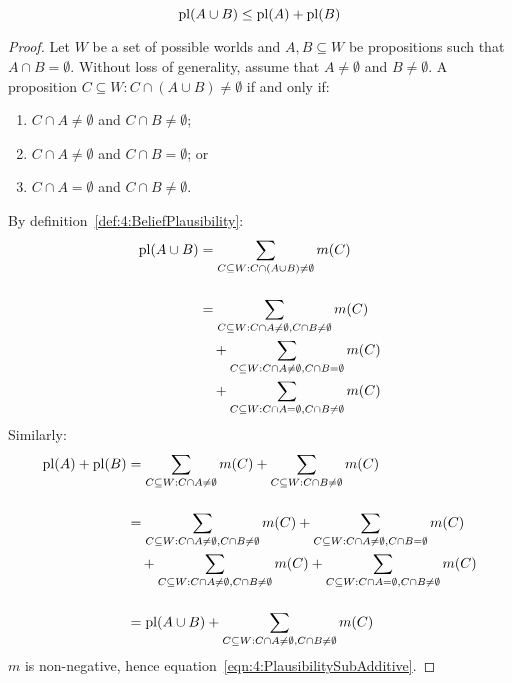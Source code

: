 \begin{thm}
  \begin{equation}
    \label{eqn:4:PlausibilitySubAdditive}
    \operatorname*{pl}(A \cup B) \leq \operatorname*{pl}(A) + \operatorname*{pl}(B)
  \end{equation}

  \begin{proof}
    Let $W$ be a set of possible worlds and $A, B \subseteq W$ be propositions
    such that $A \cap B = \emptyset$.
    Without loss of generality, assume that $A \neq \emptyset$ and
    $B \neq \emptyset$.
    A proposition $C \subseteq W : C \cap (A \cup B) \neq \emptyset$ if and only
    if:
    \begin{enumerate}
      \item $C \cap A \neq \emptyset$ and $C \cap B \neq \emptyset$;
      \item $C \cap A \neq \emptyset$ and $C \cap B = \emptyset$; or
      \item $C \cap A = \emptyset$ and $C \cap B \neq \emptyset$.
    \end{enumerate}
    By definition~\ref{def:4:BeliefPlausibility}:
    \begin{align*}
      \operatorname*{pl}(A \cup B)
       & = \sum_{C \subseteq W : C \cap (A \cup B) \neq \emptyset} m(C)                    \\[3ex]
       & = \sum_{C \subseteq W : C \cap A \neq \emptyset, C \cap B \neq \emptyset} m(C)    \\
       & \quad + \sum_{C \subseteq W : C \cap A \neq \emptyset, C \cap B = \emptyset} m(C) \\
       & \quad + \sum_{C \subseteq W : C \cap A = \emptyset, C \cap B \neq \emptyset} m(C)
    \end{align*}
    Similarly:
    \begin{align*}
      \operatorname*{pl}(A) + \operatorname*{pl}(B)
       & =
      \sum_{C \subseteq W : C \cap A \neq \emptyset} m(C) +
      \sum_{C \subseteq W : C \cap B \neq \emptyset} m(C)
      \\[3ex]
       & =
      \sum_{C \subseteq W : C \cap A \neq \emptyset, C \cap B \neq \emptyset} m(C) +
      \sum_{C \subseteq W : C \cap A \neq \emptyset, C \cap B = \emptyset} m(C)
      \\
       & \quad +
      \sum_{C \subseteq W : C \cap A \neq \emptyset, C \cap B \neq \emptyset} m(C) +
      \sum_{C \subseteq W : C \cap A = \emptyset, C \cap B \neq \emptyset} m(C)
      \\[3ex]
       & =
      \operatorname*{pl}(A \cup B) +
      \sum_{C \subseteq W : C \cap A \neq \emptyset, C \cap B \neq \emptyset} m(C)
    \end{align*}
    $m$ is non-negative, hence equation~\ref{eqn:4:PlausibilitySubAdditive}.
  \end{proof}
\end{thm}

